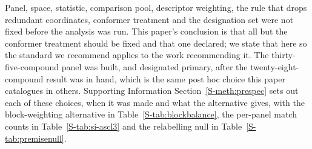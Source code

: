 \documentclass[journal=ancham,manuscript=article,margin=1in]{achemso}
\begin{document}
Panel, space, statistic, comparison pool, descriptor weighting, the rule that
drops redundant coordinates, conformer treatment and the designation set were
not fixed before the analysis was run. This paper's conclusion is that all but
the conformer treatment should be fixed and that one declared; we state
that here so the standard we recommend applies to the work recommending it. The thirty-five-compound panel was built, and designated primary, after the
twenty-eight-compound result was in hand, which is the same post hoc choice this
paper catalogues in others. Supporting Information
Section~\ref{S-meth:prespec} sets out each of these choices, when it was
made and what the alternative gives, with the block-weighting alternative in
Table~\ref{S-tab:blockbalance}, the per-panel match counts in
Table~\ref{S-tab:si-ascl3} and the relabelling null in
Table~\ref{S-tab:premisenull}.
\end{document}
